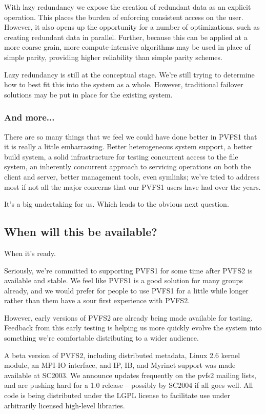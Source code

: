With lazy redundancy we expose the creation of redundant data as an explicit
operation.  This places the burden of enforcing consistent access on the
user.  However, it also opens up the opportunity for a number of
optimizations, such as creating redundant data in parallel.  Further, because
this can be applied at a more coarse grain, more compute-intensive algorithms
may be used in place of simple parity, providing higher reliability than
simple parity schemes.

Lazy redundancy is still at the conceptual stage.  We're still trying to
determine how to best fit this into the system as a whole.  However,
traditional failover solutions may be put in place for the existing system.

\subsubsection{And more...}

There are so many things that we feel we could have done better in PVFS1 that
it is really a little embarrassing.  Better heterogeneous system support, a
better build system, a solid infrastructure for testing concurrent access to
the file system, an inherently concurrent approach to servicing operations on
both the client and server, better management tools, even symlinks; we've
tried to address most if not all the major concerns that our PVFS1 users have
had over the years.

It's a big undertaking for us.  Which leads to the obvious next question.

\subsection{When will this be available?}

When it's ready.

Seriously, we're committed to supporting PVFS1 for some time after PVFS2 is
available and stable.  We feel like PVFS1 is a good solution for many groups
already, and we would prefer for people to use PVFS1 for a little while longer
rather than them have a sour first experience with PVFS2.

However, early versions of PVFS2 are already being made available for
testing.  Feedback from this early testing is helping us more quickly evolve
the system into something we're comfortable distributing to a wider audience.

A beta version of PVFS2, including distributed metadata, Linux 2.6 kernel
module, an MPI-IO interface, and IP, IB, and Myrinet support 
was made available at SC2003.  We announce updates frequently on the pvfs2
mailing lists, and are pushing hard for a 1.0 release -- possibly by
SC2004 if all goes well.  All code is being distributed under the LGPL
license to facilitate use under arbitrarily licensed high-level libraries.
